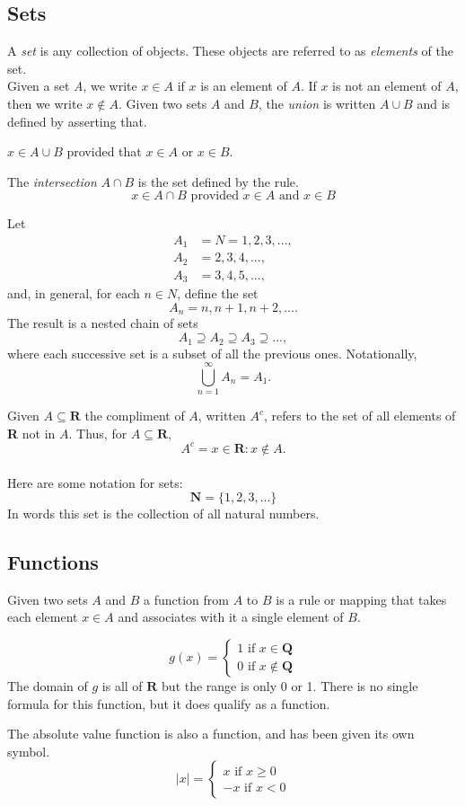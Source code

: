 \subsection{Sets}
A \textit{set} is any collection of objects. These objects are referred to as \textit{elements} of the set. \\
Given a set \textit{A}, we write $ x \in A $ if $ x $ is an element of $ A $. If $ x $ is not an element of $ A $, then we write $ x \notin A $. Given two sets $ A $ and $ B $, the \textit{union} is written $ A \cup B $ and is defined by asserting that. 
\begin{center} 
	$ x \in A \cup B $ provided that $ x \in A $ or $ x \in B $. 
\end{center}
The \textit{intersection} $ A \cap B $ is the set defined by the rule. 
\[ x \in A \cap B \text{ provided } x \in A \text{ and } x \in B \]
\begin{example}
	Let
	\begin{align*}
		A_1 &= N = {1,2,3,...}, \\
		A_2 &= {2,3,4,...}, \\
		A_3 &= {3,4,5,...},
	\end{align*}
	and, in general, for each $ n \in N $, define the set
	\[ A_n = {n, n+1, n+2, ...}. \]
	The result is a nested chain of sets
	\[ A_1 \supseteq A_2 \supseteq A_3 \supseteq ... , \]
	where each successive set is a subset of all the previous ones. Notationally, 
	\[ \bigcup^\infty_{n=1} A_n = A_1. \]
\end{example}
Given $ A \subseteq \textbf{R} $ the compliment of $ A $, written $ A^c $, refers to the set of all elements of \textbf{R} not in $ A $. Thus, for $ A \subseteq \textbf{R} $, 
\[ A^c = {x \in \textbf{R} : x \notin A}. \] \\
Here are some notation for sets:
\[ \textbf{N} = \{1,2,3,...\} \]
In words this set is the collection of all natural numbers. 
\subsection{Functions}
Given two sets $ A $ and $ B $ a function from $ A $ to $ B $ is a rule or mapping that takes each element $ x \in A $  and associates with it a single element of $ B $. 
\begin{example}
	\[ g(x) = 
		\begin{cases}
			1 \mbox{ if } x \in \textbf{Q} \\
			0 \mbox{ if } x \notin \textbf{Q}
		\end{cases} 
	\]
	The domain of $ g $ is all of $ \textbf{R} $ but the range is only 0 or 1. There is no single formula for this function, but it does qualify as a function.
\end{example}
\begin{example}
	The absolute value function is also a function, and has been given its own symbol. 
	\[ 
	|x| =
		\begin{cases}
			x \mbox{ if } x \geq 0 \\
			-x \mbox{ if } x < 0
		\end{cases}
	 \]
\end{example}
